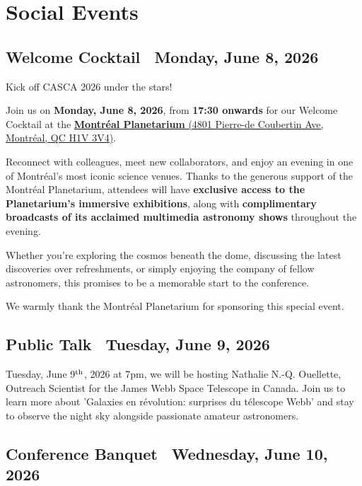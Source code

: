 \section*{Social Events}

\subsection*{Welcome Cocktail \textemdash\ Monday, June 8, 2026}
\hypertarget{nav-cocktail}{}\label{nav-page-cocktail}

Kick off CASCA 2026 under the stars!

Join us on \textbf{Monday, June 8, 2026}, from \textbf{17:30 onwards} for our Welcome Cocktail at the \href{https://maps.app.goo.gl/HZDAgXDaX6Fj45Yd9}{\textbf{Montréal Planetarium} (4801 Pierre-de Coubertin Ave, Montréal, QC H1V 3V4)}.

Reconnect with colleagues, meet new collaborators, and enjoy an evening in one of Montréal's most iconic science venues. Thanks to the generous support of the Montréal Planetarium, attendees will have \textbf{exclusive access to the Planetarium's immersive exhibitions}, along with \textbf{complimentary broadcasts of its acclaimed multimedia astronomy shows} throughout the evening.

Whether you're exploring the cosmos beneath the dome, discussing the latest discoveries over refreshments, or simply enjoying the company of fellow astronomers, this promises to be a memorable start to the conference.

We warmly thank the Montréal Planetarium for sponsoring this special event.

\subsection*{Public Talk \textemdash\ Tuesday, June 9, 2026}
\hypertarget{nav-publictalk}{}\label{nav-page-publictalk}
Tuesday, June 9$^{\rm th}$, 2026 at 7pm, we will be hosting Nathalie N.-Q. Ouellette, Outreach Scientist for the James Webb Space Telescope in Canada. Join us to learn more about 'Galaxies en révolution: surprises du télescope Webb' and stay to observe the night sky alongside passionate amateur astronomers. 

\subsection*{Conference Banquet \textemdash\ Wednesday, June 10, 2026}
\hypertarget{nav-banquet}{}\label{nav-page-banquet}

